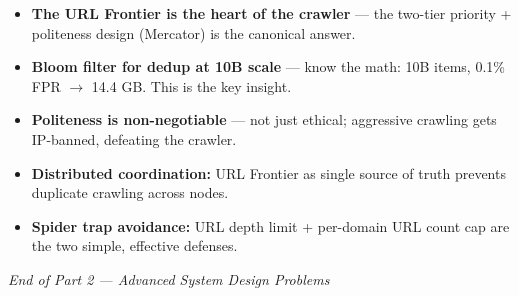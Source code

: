 \documentclass[11pt]{article}
\providecommand{\tightlist}{\setlength{\itemsep}{1pt}\setlength{\parskip}{0pt}}
\begin{document}
\begin{itemize}
\tightlist
\item
  \textbf{The URL Frontier is the heart of the crawler} --- the two-tier priority + politeness design (Mercator) is the canonical answer.
\item
  \textbf{Bloom filter for dedup at 10B scale} --- know the math: 10B items, 0.1\% FPR \(\rightarrow\) 14.4 GB. This is the key insight.
\item
  \textbf{Politeness is non-negotiable} --- not just ethical; aggressive crawling gets IP-banned, defeating the crawler.
\item
  \textbf{Distributed coordination:} URL Frontier as single source of truth prevents duplicate crawling across nodes.
\item
  \textbf{Spider trap avoidance:} URL depth limit + per-domain URL count cap are the two simple, effective defenses.
\end{itemize}

\emph{End of Part 2 --- Advanced System Design Problems}
\end{document}
